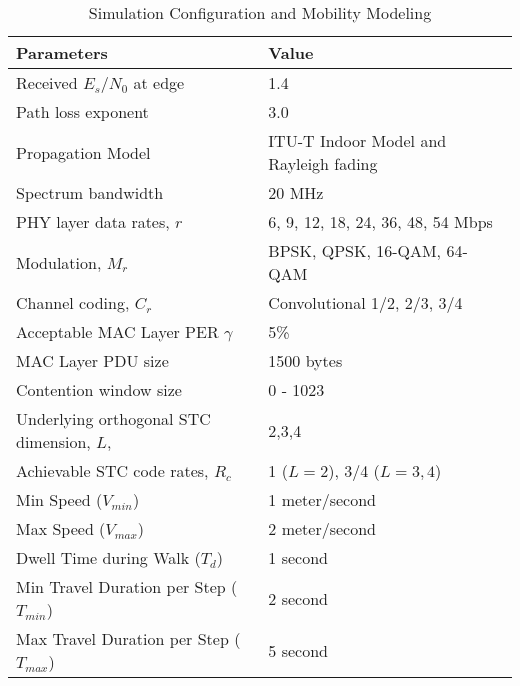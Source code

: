 \documentclass[peerreview,draftcls,onecolumn,12pt,a4paper]{IEEEtran}
\begin{document}
\begin{table}[h!]\small
\begin{minipage}[b]{1\linewidth}
 \caption{Simulation Configuration and Mobility Modeling}
\vspace{.01in} \centering
\begin{tabular}{l||l} \hline
\label{tab:WLANConfig} \textbf{Parameters} & \textbf{Value}
\\ \hline \hline Received $E_s/N_0$ at edge & 1.4 \\ \hline
Path loss exponent & 3.0\\ \hline Propagation Model & ITU-T Indoor Model and Rayleigh fading \\
\hline Spectrum bandwidth& 20 MHz \\
\hline
PHY layer data rates, $r$ & 6, 9, 12, 18, 24, 36, 48, 54 Mbps\\
\hline
Modulation, $M_r$ & BPSK, QPSK, 16-QAM, 64-QAM\\
\hline Channel coding, $C_r$ & Convolutional 1/2, 2/3, 3/4 \cite{80211-2007}\\
\hline Acceptable MAC Layer PER $\gamma$ & 5\%\\
\hline MAC Layer PDU size& 1500 bytes \\
\hline
Contention window size& 0 - 1023 \\
\hline Underlying orthogonal STC dimension, $L$, & 2,3,4 \\
\hline Achievable STC code rates, $R_{c}$ & 1 ($L=2$), 3/4
($L=3,4$)
\\ \hline \hline Min Speed ($V_{min}$) & 1 meter/second \\ \hline
Max Speed ($V_{max}$) & 2 meter/second\\ \hline  Dwell Time during Walk ($T_d$) & 1 second \\
\hline
Min Travel Duration per Step ($T_{min}$) &  2 second\\
\hline
Max Travel Duration per Step ($T_{max}$) &  5 second \\
\hline
\end{tabular}
\end{minipage} \\
\end{table}
\end{document}
